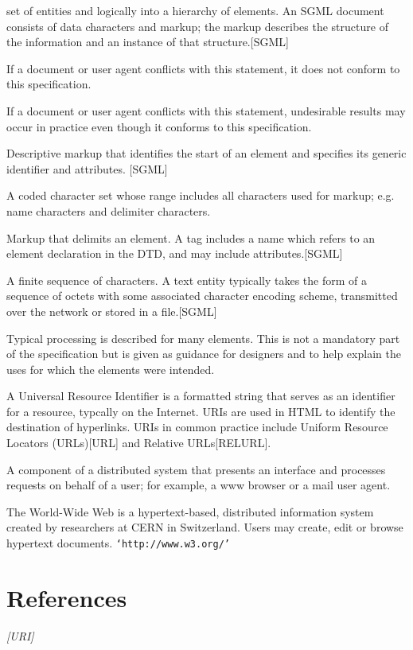 \begin{description}
set of entities and logically into a hierarchy of elements.  An SGML
document consists of data characters and markup;  the markup describes
the structure of the information and an instance of that
structure.[SGML]
\item[{\it shall}]
If a document or user agent conflicts with this statement,
it does not conform to this specification.
\item[{\it should}]
If a document or user agent conflicts with this
statement, undesirable results may occur in practice even though it
conforms to this specification.
\item[{\it start-tag}]
Descriptive markup that identifies the start of an
element and specifies its generic identifier and attributes.  [SGML]
\item[{\it syntax-reference character set}]
A coded character set whose range
includes all characters used for markup;  e.g.  name characters and
delimiter characters.
\item[{\it tag}]
Markup that delimits an element.  A tag includes a name which
refers to an element declaration in the DTD, and may include
attributes.[SGML]
\item[{\it text entity}]
A finite sequence of characters.  A text entity
typically takes the form of a sequence of octets with some associated
character encoding scheme, transmitted over the network or stored in a
file.[SGML]
\item[{\it typical}]
Typical processing is described for many elements.  This
is not a mandatory part of the specification but is given as guidance
for designers and to help explain the uses for which the elements were
intended.
\item[{\it URI}]
A Universal Resource Identifier is a formatted string that
serves as an identifier for a resource, typcally on the Internet.  URIs
are used in HTML to identify the destination of hyperlinks.  URIs in
common practice include Uniform Resource Locators (URLs)[URL]
and Relative URLs[RELURL].
\item[{\it user agent}]
A component of a distributed system that presents
an interface and processes requests on behalf of a user;  for example,
a www browser or a mail user agent.
\item[{\it WWW}]
The World-Wide Web is a hypertext-based, distributed
information system created by researchers at CERN in
Switzerland.  Users may create, edit or browse hypertext
documents.  {\tt `http://www.w3.org/'}\end{description}\section*{References}\begin{description}\item[{\it [URI]}]

\end{description}
